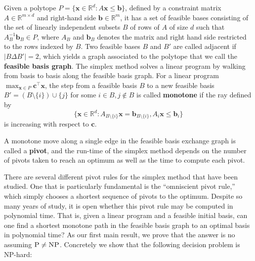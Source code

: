 \documentclass[centering,11pt,reqno]{amsart}
\theoremstyle{definition}
\newcommand{\NP}{\textsc{NP}}
\newcommand{\PP}{\textsc{P}}
\begin{document}
Given a polytope $P = \{\mathbf{x} \in \mathbb{R}^{d}: A \mathbf{x} \leq \mathbf{b}\}$, defined by a constraint matrix $A\in \mathbb{R}^{m \times d}$ and right-hand side $\mathbf{b}\in \mathbb{R}^m$, it has a set of feasible bases consisting of the set of linearly independent subsets $B$ of rows of $A$ of size $d$ such that $A_{B}^{-1}\mathbf{b}_{B} \in P$, where $A_{B}$ and $\mathbf{b}_{B}$ denotes the matrix and right hand side restricted to the rows indexed by $B$. Two feasible bases $B$ and $B'$ are called adjacent if $|B \Delta B'| = 2$, which yields a graph associated to the polytope that we call the \textbf{feasible basis graph}. The simplex method solves a linear program by walking from basis to basis along the feasible basis graph. For a linear program $\max_{\mathbf{x}\in P}\mathbf{c}^{\intercal} \mathbf{x}$, the step from a feasible basis $B$ to a new feasible basis $B' = (B \setminus \{i\}) \cup \{j\}$ for some $i\in B, j\notin B$ is called \textbf{monotone} if the ray defined by 
\[\{\mathbf{x} \in \mathbb{R}^{d}: A_{B\setminus \{i\}} \mathbf{x} = \mathbf{b}_{B\setminus \{i\}}, A_{i}\mathbf{x}\leq \mathbf{b}_{i}\}\] 
is increasing with respect to $\mathbf{c}$. 

A monotone move along a single edge in the feasible basis exchange graph is called a \textbf{pivot}, and the run-time of the simplex method depends on the number of pivots taken to reach an optimum as well as the time to compute each pivot. 

There are several different pivot rules for the simplex method that have been studied. One that is particularly fundamental is the ``omniscient pivot rule,'' which simply chooses a shortest sequence of pivots to the optimum. Despite so many years of study, it is open whether this pivot rule may be computed in polynomial time. That is, given a linear program and a feasible initial basis, can one find a shortest monotone path in the feasible basis graph to an optimal basis in polynomial time? As our first main result, we prove that the answer is no assuming $\PP \neq \NP$. Concretely we show that the following decision problem is \NP-hard:

\medskip
\end{document}
